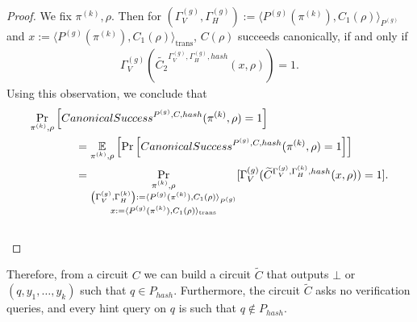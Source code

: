 %
\begin{proof}
We fix $\pi^{(k)}, \rho$. Then for $(\Gamma_V^{(g)}, \Gamma_H^{(g)}) := \langle P^{(g)}(\pi^{(k)}), C_1(\rho) \rangle_{P^{(g)}}$ and
$x := \langle P^{(g)}(\pi^{(k)}), C_1(\rho) \rangle_{\text{trans}}$, $C(\rho)$ succeeds canonically, if and only if
\begin{align*}
\Gamma_V^{(g)} (\widetilde{C_2}^{\Gamma_V^{(g)}, \Gamma_H^{(g)}, hash}(x, \rho)) = 1.
\end{align*}
Using this observation, we conclude that
\begin{align*}
  &\underset{\pi^{(k)}, \rho}{\Pr}\left[CanonicalSuccess^{P^{(g)}, C, hash}(\pi^{(k)}, \rho) = 1\right] \\
  &\mbox\qquad\qquad = \underset{\pi^{(k)}, \rho}{\mathbb{E}}\left[\underset{}{\Pr}\left[CanonicalSuccess^{P^{(g)}, C, hash}(\pi^{(k)}, \rho) = 1\right]\right] \\
  &\mbox\qquad\qquad = \underset{\substack{\pi^{(k)}, \rho \\
      \left(\Gamma_V^{(g)}, \Gamma_H^{(k)}\right) := \langle P^{(g)}(\pi^{(k)}), C_1(\rho) \rangle_{P^{(g)}} \\
      x := \langle P^{(g)}(\pi^{(k)}), C_1(\rho) \rangle_{\text{trans}}}}
  {\Pr}[\Gamma_V^{(g)} (\widetilde{C}^{\Gamma_V^{(g)}, \Gamma_H^{(k)}, hash}(x, \rho)) = 1].
\end{align*}
\\\text{  }
\end{proof}
%
Therefore, from a circuit $C$ we can build a circuit $\widetilde{C}$ that outputs $\bot$ or $(q, y_1, \dots, y_k)$ such that $q \in P_{hash}$.
Furthermore, the circuit $\widetilde{C}$ asks no verification queries, and every hint query on $q$ is such that $q \notin P_{hash}$.
%
